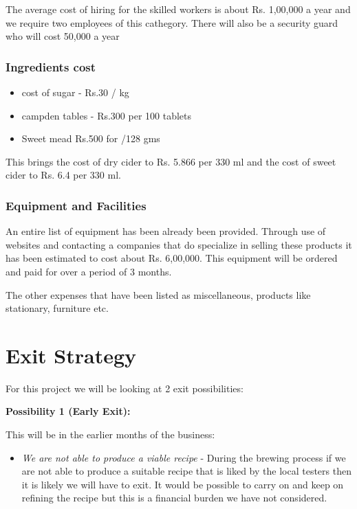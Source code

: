 \documentclass[11pt]{article}
\begin{document}
The average cost of hiring for the skilled workers is about Rs. 1,00,000 a year
and we require two employees of this cathegory. There will also be a security
guard who will cost 50,000 a year

   \subsubsection{Ingredients cost}
\begin{itemize}
\item cost of sugar -  Rs.30 / kg
\item campden tables  - Rs.300 per 100 tablets
\item Sweet mead Rs.500 for /128 gms
\end{itemize}

This brings the cost of dry cider to Rs. 5.866 per 330 ml and the cost of sweet 
cider to Rs. 6.4 per 330 ml.

     \subsubsection{Equipment and Facilities}
An entire list of equipment has been already been provided. Through use of
websites and contacting a companies that do specialize in selling these products
it has been estimated to cost about Rs. 6,00,000. This equipment will be 
ordered and paid for over a period of 3 months.

The other expenses that have been listed as miscellaneous, products like
stationary, furniture etc.

\newpage


\section{Exit Strategy}
For this project we will be looking at 2 exit possibilities:

\textbf{Possibility 1 (Early Exit):}

This will be in the earlier months of the business:
  \begin{itemize}
	\item \emph{We are not able to produce a viable recipe} - During the brewing
process if we are not able to produce a suitable recipe that is liked by the 
local testers then it is likely we will have to exit. It would be possible to 
carry on and keep on refining the recipe but this is a financial burden we have 
not considered.
  \end{itemize}
\end{document}
